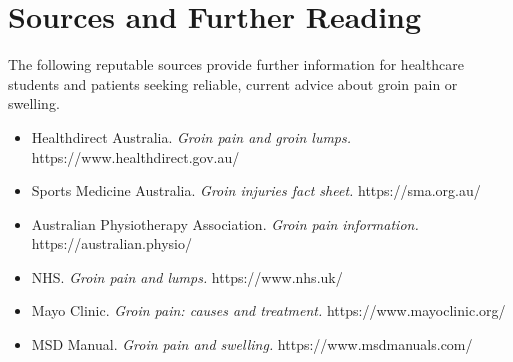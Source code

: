 \section*{Sources and Further Reading}
The following reputable sources provide further information for healthcare students and patients seeking reliable, current advice about groin pain or swelling.

\begin{itemize}
    \item Healthdirect Australia. \textit{Groin pain and groin lumps.} https://www.healthdirect.gov.au/
    \item Sports Medicine Australia. \textit{Groin injuries fact sheet.} https://sma.org.au/
    \item Australian Physiotherapy Association. \textit{Groin pain information.} https://australian.physio/
    \item NHS. \textit{Groin pain and lumps.} https://www.nhs.uk/
    \item Mayo Clinic. \textit{Groin pain: causes and treatment.} https://www.mayoclinic.org/
    \item MSD Manual. \textit{Groin pain and swelling.} https://www.msdmanuals.com/
\end{itemize}
